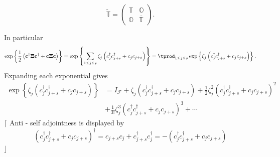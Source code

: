 \documentclass[aps, preprint]{revtex4}
\begin{document}
\begin{equation}\widetilde{\mathbb{T}} =\left (\begin{array}{cc}\mathbb{T} & \mathbb{O} \\
\mathbb{O} & \overline{\mathbb{T}}\end{array}\right )\text{.}
\end{equation}

In particular
\begin{equation}\exp  \left \{\frac{1}{2} \left (\mathbf{c}^{ \dag } \mathbf{\Xi } \mathbf{c}^{ \dag } +\mathbf{c} \mathbf{\Xi } \mathbf{c}\right )\right \} =\exp  \left \{ \sum _{1 \leq j \leq s}\zeta _{j} \left (c_{j}^{ \dag } c_{j +s}^{ \dag } +c_{j} c_{j +s}\right )\right \} = \tprod _{1 \leq j \leq s}\exp  \left \{\zeta _{j} \left (c_{j}^{ \dag } c_{j +s}^{ \dag } +c_{j} c_{j +s}\right )\right \}\text{.}
\end{equation}Expanding each exponential gives
\begin{align}\exp  \left \{\zeta _{j} \left (c_{j}^{ \dag } c_{j +s}^{ \dag } +c_{j} c_{j +s}\right )\right \} &  =I_{\mathcal{F}} +\zeta _{j} \left (c_{j}^{ \dag } c_{j +s}^{ \dag } +c_{j} c_{j +s}\right ) +\frac{1}{2} \zeta _{j}^{2} \left (c_{j}^{ \dag } c_{j +s}^{ \dag } +c_{j} c_{j +s}\right )^{2} \\
 &  +\frac{1}{3 !} \zeta _{j}^{3} \left (c_{j}^{ \dag } c_{j +s}^{ \dag } +c_{j} c_{j +s}\right )^{3} +\cdots \end{align}$\lceil $ Anti - self adjointness is displayed by
\begin{equation}\left (c_{j}^{ \dag } c_{j +s}^{ \dag } +c_{j} c_{j +s}\right )^{ \dag } =c_{j +s} c_{j} +c_{j +s}^{ \dag } c_{j}^{ \dag } = -\left (c_{j}^{ \dag } c_{j +s}^{ \dag } +c_{j} c_{j +s}\right )
\end{equation}$\rfloor $ 
\end{document}
